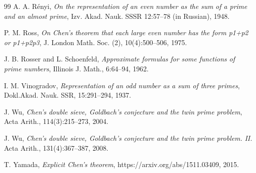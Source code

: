 \documentclass[12pt]{amsart}
\begin{document}
\begin{thebibliography}{99}
A. A. R\'enyi,
\textit{On the representation of an even number as the sum of a prime and an
almost prime}, Izv. Akad. Nauk. SSSR 12:57--78 (in Russian), 1948.

P. M. Ross, 
\textit{On Chen's theorem that each large even number has the form p1+p2 or p1+p2p3},
J. London Math. Soc. (2), 10(4):500--506, 1975. 

J. B. Rosser and L. Schoenfeld, 
\textit{Approximate formulas for some functions of prime numbers},
Illinois J. Math., 6:64--94, 1962.

I. M. Vinogradov, 
\textit{Representation of an odd number as a sum of three primes},
Dokl.Akad. Nauk. SSR, 15:291–294, 1937.

J. Wu, 
\textit{Chen's double sieve, Goldbach's conjecture and the twin prime problem},
Acta Arith., 114(3):215--273, 2004. 

J. Wu, 
\textit{Chen's double sieve, Goldbach's conjecture and the twin prime problem. II.}
Acta Arith., 131(4):367--387, 2008.

T. Yamada,
\textit{Explicit Chen's theorem},
https://arxiv.org/abs/1511.03409, 2015.





\end{thebibliography} 
\end{document}
